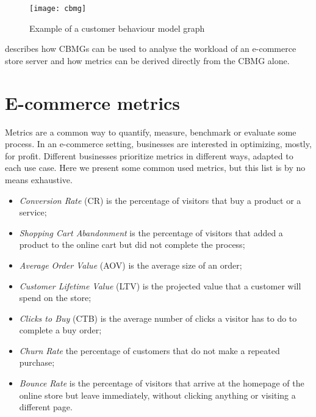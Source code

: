\begin{figure}[h]
    \begin{center}
        \leavevmode
        \texttt{[image: cbmg]}
        \caption{Example of a customer behaviour model graph \cite{Menasce1999}}
        \label{fig:cbmg}
    \end{center}
\end{figure}

\cite{Menasce1999} describes how CBMGs can be used to analyse the workload of 
an e-commerce store server and how metrics can be derived directly from the 
CBMG alone.

\section{E-commerce metrics}

Metrics are a common way to quantify, measure, benchmark or evaluate some 
process. In an e-commerce setting, businesses are interested in optimizing, 
mostly, for profit. Different businesses prioritize metrics in different ways, 
adapted to each use case. Here we present some common used metrics, but this 
list is by no means exhaustive. \cite{Sterne2000, Menasce1999}

\begin{itemize}
    \item \textit{Conversion Rate} (CR) is the percentage of visitors that buy 
    a product or a service;
    \item \textit{Shopping Cart Abandonment} is the percentage of visitors that 
    added a product to the online cart but did not complete the process;
    \item \textit{Average Order Value} (AOV) is the average size of an order;
    \item \textit{Customer Lifetime Value} (LTV) is the projected value that a 
    customer will spend on the store;
    \item \textit{Clicks to Buy} (CTB) is the average number of clicks a 
    visitor has to do to complete a buy order;
    \item \textit{Churn Rate} the percentage of customers that do not make a 
    repeated purchase;
    \item \textit{Bounce Rate} is the percentage of visitors that arrive at the 
    homepage of the online store but leave immediately, without clicking 
    anything or visiting a different page.
\end{itemize}


